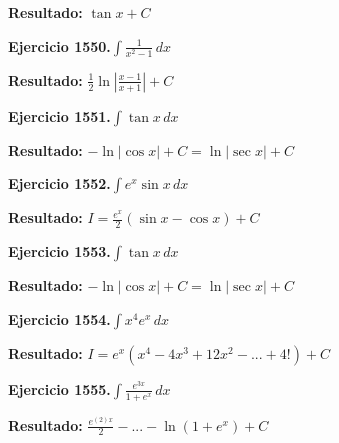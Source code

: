 \documentclass[10pt,a4paper]{article}
\begin{document}
\begin{solbox}
\textbf{Resultado:} \(\displaystyle \tan x + C\)
\end{solbox}

\begin{ejbox}
\textbf{Ejercicio 1550.}\quad $\int \frac{1}{x^2-1}\,dx$
\end{ejbox}

\begin{solbox}
\textbf{Resultado:} \(\displaystyle \frac{1}{2}\ln\left|\frac{x-1}{x+1}\right| + C\)
\end{solbox}

\begin{ejbox}
\textbf{Ejercicio 1551.}\quad $\int \tan x\,dx$
\end{ejbox}

\begin{solbox}
\textbf{Resultado:} \(\displaystyle -\ln|\cos x| + C = \ln|\sec x| + C\)
\end{solbox}

\newpage
\begin{ejbox}
\textbf{Ejercicio 1552.}\quad $\int e^x\sin x\,dx$
\end{ejbox}

\begin{solbox}
\textbf{Resultado:} \(\displaystyle I = \frac{e^x}{2}(\sin x - \cos x) + C\)
\end{solbox}

\begin{ejbox}
\textbf{Ejercicio 1553.}\quad $\int \tan x\,dx$
\end{ejbox}

\begin{solbox}
\textbf{Resultado:} \(\displaystyle -\ln|\cos x| + C = \ln|\sec x| + C\)
\end{solbox}

\begin{ejbox}
\textbf{Ejercicio 1554.}\quad $\int x^{4} e^x\,dx$
\end{ejbox}

\begin{solbox}
\textbf{Resultado:} \(\displaystyle I = e^x(x^{4} - 4x^{3} + 12x^{2} - ... + 4!) + C\)
\end{solbox}

\newpage
\begin{ejbox}
\textbf{Ejercicio 1555.}\quad $\int \frac{e^{3x}}{1+e^{x}}\,dx$
\end{ejbox}

\begin{solbox}
\textbf{Resultado:} \(\displaystyle \frac{e^{(2)x}}{2} - ... - \ln(1+e^x) + C\)
\end{solbox}
\end{document}
